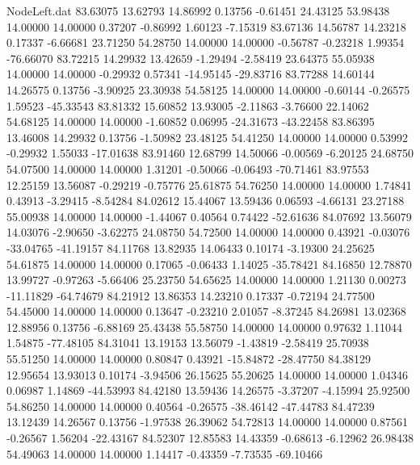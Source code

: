 \begin{filecontents}{NodeLeft.dat}
  83.63075   13.62793   14.86992     0.13756   -0.61451   24.43125   53.98438   14.00000   14.00000    0.37207   -0.86992    1.60123   -7.15319
  83.67136   14.56787   14.23218     0.17337   -6.66681   23.71250   54.28750   14.00000   14.00000   -0.56787   -0.23218    1.99354  -76.66070
  83.72215   14.29932   13.42659    -1.29494   -2.58419   23.64375   55.05938   14.00000   14.00000   -0.29932    0.57341  -14.95145  -29.83716
  83.77288   14.60144   14.26575     0.13756   -3.90925   23.30938   54.58125   14.00000   14.00000   -0.60144   -0.26575    1.59523  -45.33543
  83.81332   15.60852   13.93005    -2.11863   -3.76600   22.14062   54.68125   14.00000   14.00000   -1.60852    0.06995  -24.31673  -43.22458
  83.86395   13.46008   14.29932     0.13756   -1.50982   23.48125   54.41250   14.00000   14.00000    0.53992   -0.29932    1.55033  -17.01638
  83.91460   12.68799   14.50066    -0.00569   -6.20125   24.68750   54.07500   14.00000   14.00000    1.31201   -0.50066   -0.06493  -70.71461
  83.97553   12.25159   13.56087    -0.29219   -0.75776   25.61875   54.76250   14.00000   14.00000    1.74841    0.43913   -3.29415   -8.54284
  84.02612   15.44067   13.59436     0.06593   -4.66131   23.27188   55.00938   14.00000   14.00000   -1.44067    0.40564    0.74422  -52.61636
  84.07692   13.56079   14.03076    -2.90650   -3.62275   24.08750   54.72500   14.00000   14.00000    0.43921   -0.03076  -33.04765  -41.19157
  84.11768   13.82935   14.06433     0.10174   -3.19300   24.25625   54.61875   14.00000   14.00000    0.17065   -0.06433    1.14025  -35.78421
  84.16850   12.78870   13.99727    -0.97263   -5.66406   25.23750   54.65625   14.00000   14.00000    1.21130    0.00273  -11.11829  -64.74679
  84.21912   13.86353   14.23210     0.17337   -0.72194   24.77500   54.45000   14.00000   14.00000    0.13647   -0.23210    2.01057   -8.37245
  84.26981   13.02368   12.88956     0.13756   -6.88169   25.43438   55.58750   14.00000   14.00000    0.97632    1.11044    1.54875  -77.48105
  84.31041   13.19153   13.56079    -1.43819   -2.58419   25.70938   55.51250   14.00000   14.00000    0.80847    0.43921  -15.84872  -28.47750
  84.38129   12.95654   13.93013     0.10174   -3.94506   26.15625   55.20625   14.00000   14.00000    1.04346    0.06987    1.14869  -44.53993
  84.42180   13.59436   14.26575    -3.37207   -4.15994   25.92500   54.86250   14.00000   14.00000    0.40564   -0.26575  -38.46142  -47.44783
  84.47239   13.12439   14.26567     0.13756   -1.97538   26.39062   54.72813   14.00000   14.00000    0.87561   -0.26567    1.56204  -22.43167
  84.52307   12.85583   14.43359    -0.68613   -6.12962   26.98438   54.49063   14.00000   14.00000    1.14417   -0.43359   -7.73535  -69.10466

\end{filecontents}
